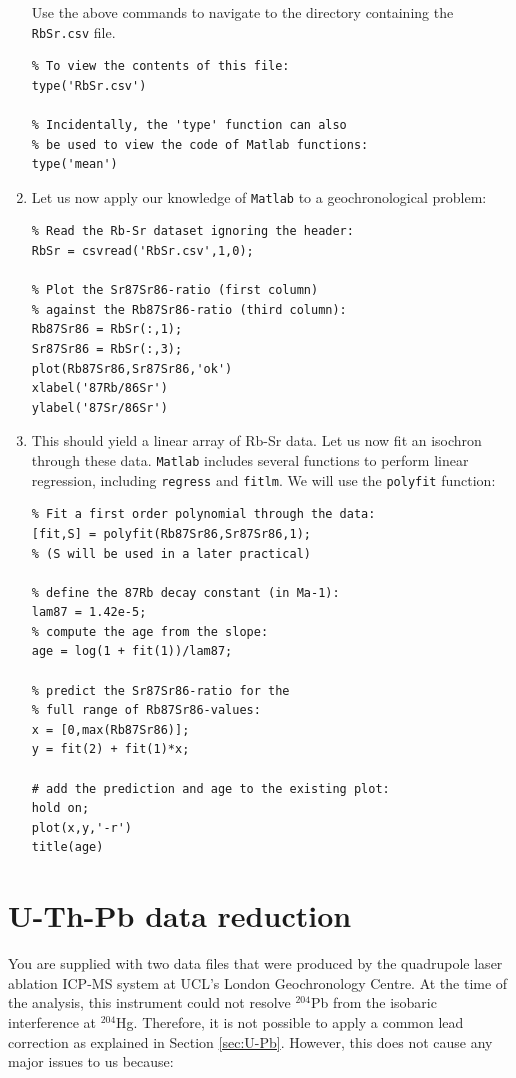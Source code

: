 \documentclass{book}
\begin{document}
\begin{enumerate}
Use the above commands to navigate to the directory containing the
\texttt{RbSr.csv} file.

\begin{verbatim}
% To view the contents of this file:
type('RbSr.csv')

% Incidentally, the 'type' function can also 
% be used to view the code of Matlab functions:
type('mean')
\end{verbatim}

\item Let us now apply our knowledge of \texttt{Matlab} to a
  geochronological problem:

\begin{verbatim}
% Read the Rb-Sr dataset ignoring the header:
RbSr = csvread('RbSr.csv',1,0);

% Plot the Sr87Sr86-ratio (first column)
% against the Rb87Sr86-ratio (third column):
Rb87Sr86 = RbSr(:,1);
Sr87Sr86 = RbSr(:,3);
plot(Rb87Sr86,Sr87Sr86,'ok')
xlabel('87Rb/86Sr')
ylabel('87Sr/86Sr')
\end{verbatim}

\item This should yield a linear array of Rb-Sr data. Let us now fit
  an isochron through these data. \texttt{Matlab} includes several
  functions to perform linear regression, including \texttt{regress}
  and \texttt{fitlm}. We will use the \texttt{polyfit} function:

\begin{verbatim}
% Fit a first order polynomial through the data:
[fit,S] = polyfit(Rb87Sr86,Sr87Sr86,1);
% (S will be used in a later practical)

% define the 87Rb decay constant (in Ma-1):
lam87 = 1.42e-5;
% compute the age from the slope:
age = log(1 + fit(1))/lam87;

% predict the Sr87Sr86-ratio for the
% full range of Rb87Sr86-values:
x = [0,max(Rb87Sr86)];
y = fit(2) + fit(1)*x;

# add the prediction and age to the existing plot:
hold on;
plot(x,y,'-r')
title(age)
\end{verbatim}

\end{enumerate}

\section{U-Th-Pb data reduction}
\label{sec:U-Pb-R}

You are supplied with two data files that were produced by the
quadrupole laser ablation ICP-MS system at UCL's London Geochronology
Centre. At the time of the analysis, this instrument could not resolve
$^{204}$Pb from the isobaric interference at $^{204}$Hg. Therefore, it
is not possible to apply a common lead correction as explained in
Section \ref{sec:U-Pb}. However, this does not cause any major issues
to us because:
\end{document}
